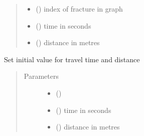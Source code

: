 \documentclass[letterpaper,10pt,english]{sphinxmanual}
\begin{document}
\begin{fulllineitems}
\begin{fulllineitems}
\begin{quote}
\begin{description}
\begin{itemize}
\item {} 
 () \textendash{} index of fracture in graph

\item {} 
 () \textendash{} time in seconds

\item {} 
 () \textendash{} distance in metres

\end{itemize}

\end{description}\end{quote}

\end{fulllineitems}


\begin{fulllineitems}
\label{\detokenize{pydfnworks:pydfnworks.dfnGraph.graph_transport.Particle.set_start_time_dist}}
Set initial value for travel time and distance
\begin{quote}\begin{description}
\item[{Parameters}] \leavevmode\begin{itemize}
\item {} 
 () \textendash{} 

\item {} 
 () \textendash{} time in seconds

\item {} 
 () \textendash{} distance in metres

\end{itemize}

\end{description}\end{quote}


\end{fulllineitems}
\end{fulllineitems}
\end{document}
